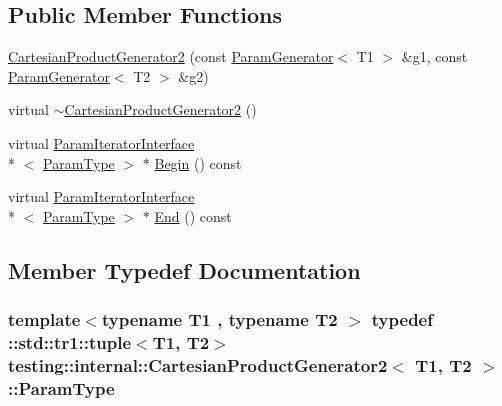 \subsection*{Public Member Functions}
\begin{DoxyCompactItemize}
\item 
\hyperlink{classtesting_1_1internal_1_1_cartesian_product_generator2_a971ef5a45783db277f5fae84eaef41a3}{Cartesian\-Product\-Generator2} (const \hyperlink{classtesting_1_1internal_1_1_param_generator}{Param\-Generator}$<$ T1 $>$ \&g1, const \hyperlink{classtesting_1_1internal_1_1_param_generator}{Param\-Generator}$<$ T2 $>$ \&g2)
\item 
virtual \hyperlink{classtesting_1_1internal_1_1_cartesian_product_generator2_a0c7875565b4942e3c3f5aed303722c75}{$\sim$\-Cartesian\-Product\-Generator2} ()
\item 
virtual \hyperlink{classtesting_1_1internal_1_1_param_iterator_interface}{Param\-Iterator\-Interface}\\*
$<$ \hyperlink{classtesting_1_1internal_1_1_cartesian_product_generator2_a036b6f14a61a69fac5d21dd7ff5b8913}{Param\-Type} $>$ $\ast$ \hyperlink{classtesting_1_1internal_1_1_cartesian_product_generator2_a0897553749c928a1ee5ea7b581d2d59b}{Begin} () const 
\item 
virtual \hyperlink{classtesting_1_1internal_1_1_param_iterator_interface}{Param\-Iterator\-Interface}\\*
$<$ \hyperlink{classtesting_1_1internal_1_1_cartesian_product_generator2_a036b6f14a61a69fac5d21dd7ff5b8913}{Param\-Type} $>$ $\ast$ \hyperlink{classtesting_1_1internal_1_1_cartesian_product_generator2_a3b02163a9c9d5f0e930b0740de7e876a}{End} () const 
\end{DoxyCompactItemize}


\subsection{Member Typedef Documentation}
\hypertarget{classtesting_1_1internal_1_1_cartesian_product_generator2_a036b6f14a61a69fac5d21dd7ff5b8913}{
\subsubsection[{Param\-Type}]{\setlength{\rightskip}{0pt plus 5cm}template$<$typename T1 , typename T2 $>$ typedef \-::{\bf std\-::tr1\-::tuple}$<$T1, T2$>$ {\bf testing\-::internal\-::\-Cartesian\-Product\-Generator2}$<$ T1, T2 $>$\-::{\bf Param\-Type}}}\label{classtesting_1_1internal_1_1_cartesian_product_generator2_a036b6f14a61a69fac5d21dd7ff5b8913}


